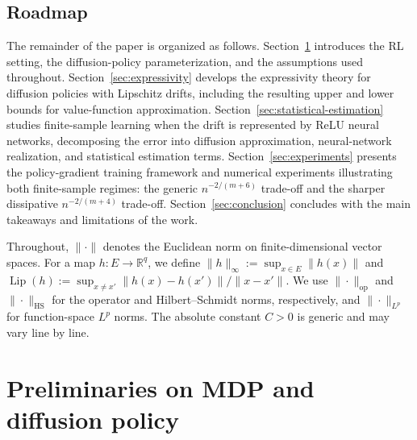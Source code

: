 \documentclass{article}
\newcommand{\1}{\mathbbm{1}}
\numberwithin{equation}{section}
\def\to{\rightarrow}
\begin{document}
\subsection{Roadmap}
The remainder of the paper is organized as follows. Section~\ref{sec:prelim} introduces the RL setting, the diffusion-policy parameterization, and the assumptions used throughout. Section~\ref{sec:expressivity} develops the expressivity theory for diffusion policies with Lipschitz drifts, including the resulting upper and lower bounds for value-function approximation. Section~\ref{sec:statistical-estimation} studies finite-sample learning when the drift is represented by ReLU neural networks, decomposing the error into diffusion approximation, neural-network realization, and statistical estimation terms. Section~\ref{sec:experiments} presents the policy-gradient training framework and numerical experiments illustrating both finite-sample regimes: the generic \(n^{-2/(m+6)}\) trade-off and the sharper dissipative \(n^{-2/(m+4)}\) trade-off. Section~\ref{sec:conclusion} concludes with the main takeaways and limitations of the work. %

Throughout, \(\|\cdot\|\) denotes the Euclidean norm on finite-dimensional
vector spaces. For a map \(h:E\to\mathbb{R}^q\), we define
\(\|h\|_\infty:=\sup_{x\in E}\|h(x)\|\) and
\(\operatorname{Lip}(h):=\sup_{x\neq x'}
\|h(x)-h(x')\|/\|x-x'\|\).
We use \(\|\cdot\|_{\mathrm{op}}\) and \(\|\cdot\|_{\mathrm{HS}}\) for the
operator and Hilbert--Schmidt norms, respectively, and
\(\|\cdot\|_{L^p}\) for function-space \(L^p\) norms. The absolute constant $C>0$ is generic and may vary line by line.
\section{Preliminaries on MDP and diffusion policy}
\label{sec:prelim}
\end{document}

